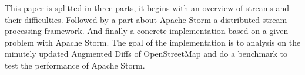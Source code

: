 This paper is splitted in three parts, it begins with an overview of streams and their difficulties.
Followed by a part about Apache Storm a distributed stream processing framework.
And finally a concrete implementation based on a given problem with Apache Storm.
The goal of the implementation is to analysis on the minutely updated Augmented Diffs of OpenStreetMap
and do a benchmark to test the performance of Apache Storm.